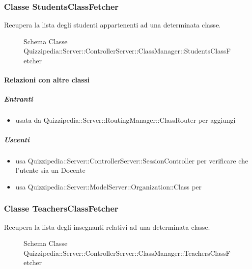 \subsubsection{Classe StudentsClassFetcher}
Recupera la lista degli studenti appartenenti ad una determinata classe.
\begin{figure}[H]
\centering
\noindent{}
\caption[Schema Classe StudentsClassFetcher]{Schema Classe Quizzipedia::Server::ControllerServer::ClassManager::StudentsClassFetcher}
\end{figure}
\paragraph{Relazioni con altre classi}
\subparagraph{Entranti}
\begin{itemize}
\item usata da Quizzipedia::Server::RoutingManager::ClassRouter per aggiungi
\end{itemize}
\subparagraph{Uscenti}
\begin{itemize}
\item usa Quizzipedia::Server::ControllerServer::SessionController per verificare che l'utente sia un Docente
\item usa Quizzipedia::Server::ModelServer::Organization::Class per 
\end{itemize}
\subsubsection{Classe TeachersClassFetcher}
Recupera la lista degli insegnanti relativi ad una determinata classe.
\begin{figure}[H]
\centering
\noindent{}
\caption[Schema Classe TeachersClassFetcher]{Schema Classe Quizzipedia::Server::ControllerServer::ClassManager::TeachersClassFetcher}
\end{figure}
